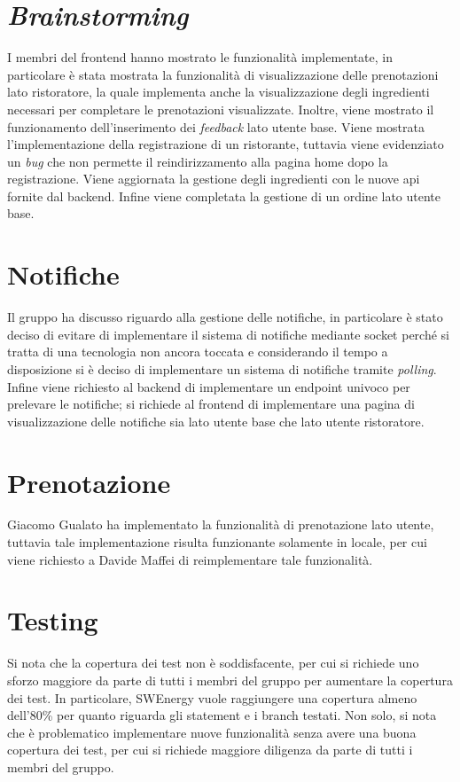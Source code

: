 \section{\textit{Brainstorming}}

I membri del frontend hanno mostrato le funzionalità implementate, in
particolare è stata mostrata la funzionalità di visualizzazione delle
prenotazioni lato ristoratore, la quale implementa anche la visualizzazione
degli ingredienti necessari per completare le prenotazioni visualizzate.
Inoltre, viene mostrato il funzionamento dell'inserimento dei \textit{feedback}
lato utente base. Viene mostrata l'implementazione della registrazione di un
ristorante, tuttavia viene evidenziato un \textit{bug} che non permette il
reindirizzamento alla pagina home dopo la registrazione. Viene aggiornata la
gestione degli ingredienti con le nuove api fornite dal backend. Infine viene
completata la gestione di un ordine lato utente base.

\section{Notifiche}

Il gruppo ha discusso riguardo alla gestione delle notifiche, in particolare è
stato deciso di evitare di implementare il sistema di notifiche mediante socket
perché si tratta di una tecnologia non ancora toccata e considerando il tempo a
disposizione si è deciso di implementare un sistema di notifiche tramite
\textit{polling}. Infine viene richiesto al backend di implementare un endpoint
univoco per prelevare le notifiche; si richiede al frontend di implementare una
pagina di visualizzazione delle notifiche sia lato utente base che lato
utente ristoratore.

\section{Prenotazione}

Giacomo Gualato ha implementato la funzionalità di prenotazione lato utente,
tuttavia tale implementazione risulta funzionante solamente in locale, per cui
viene richiesto a Davide Maffei di reimplementare tale funzionalità.

\section{Testing}

Si nota che la copertura dei test non è soddisfacente, per cui si richiede uno
sforzo maggiore da parte di tutti i membri del gruppo per aumentare la copertura
dei test. In particolare, SWEnergy vuole raggiungere una copertura almeno
dell'80\% per quanto riguarda gli statement e i branch testati. Non solo, si
nota che è problematico implementare nuove funzionalità senza avere una buona
copertura dei test, per cui si richiede maggiore diligenza da parte di tutti i
membri del gruppo.

